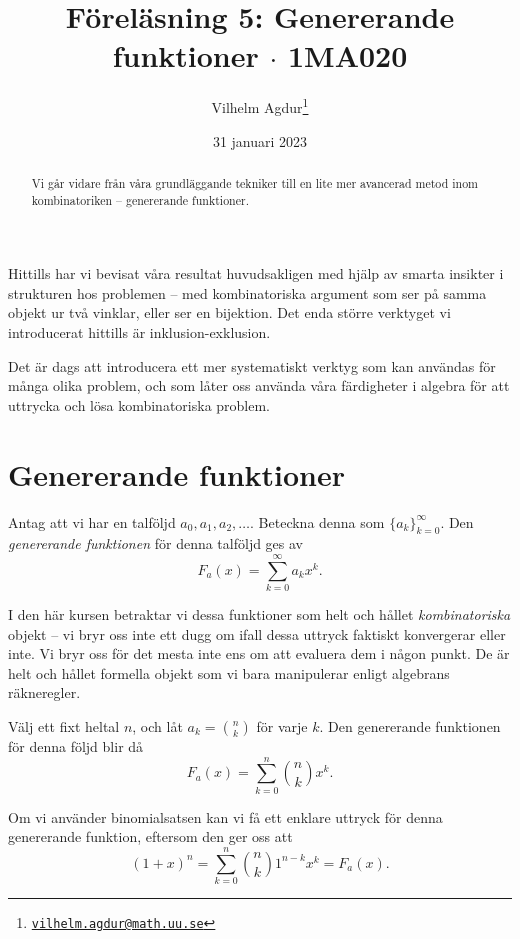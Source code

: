 \documentclass[nobib]{tufte-handout}
\title{Föreläsning 5: Genererande funktioner $\cdot$ 1MA020}
\author[Vilhelm Agdur]{Vilhelm Agdur\thanks{\href{mailto:vilhelm.agdur@math.uu.se}{\nolinkurl{vilhelm.agdur@math.uu.se}}}}
\date{31 januari 2023}
\begin{document}

\maketitle%

\begin{abstract}
\noindent
Vi går vidare från våra grundläggande tekniker till en lite mer avancerad metod inom kombinatoriken -- genererande funktioner.
\end{abstract}

Hittills har vi bevisat våra resultat huvudsakligen med hjälp av smarta insikter i strukturen hos problemen -- med kombinatoriska argument som ser på samma objekt ur två vinklar, eller ser en bijektion. Det enda större verktyget vi introducerat hittills är inklusion-exklusion.

Det är dags att introducera ett mer systematiskt verktyg som kan användas för många olika problem, och som låter oss använda våra färdigheter i algebra för att uttrycka och lösa kombinatoriska problem.

\section{Genererande funktioner}

\begin{definition}
    Antag att vi har en talföljd $a_0, a_1, a_2, \ldots$. Beteckna denna som $\{a_k\}_{k=0}^\infty$. Den \emph{genererande funktionen} för denna talföljd ges av
    $$F_{a}(x) = \sum_{k=0}^{\infty} a_k x^k.$$
\end{definition}

I den här kursen betraktar vi dessa funktioner som helt och hållet \emph{kombinatoriska} objekt -- vi bryr oss inte ett dugg om ifall dessa uttryck faktiskt konvergerar eller inte. Vi bryr oss för det mesta inte ens om att evaluera dem i någon punkt. De är helt och hållet formella objekt som vi bara manipulerar enligt algebrans räkneregler.

\begin{example}
    Välj ett fixt heltal $n$, och låt $a_k = \binom{n}{k}$ för varje $k$. Den genererande funktionen för denna följd blir då
    $$F_a(x) = \sum_{k=0}^{n}\binom{n}{k}x^k.$$

    Om vi använder binomialsatsen kan vi få ett enklare uttryck för denna genererande funktion, eftersom den ger oss att
    $$(1+x)^n = \sum_{k= 0}^{n}\binom{n}{k}1^{n-k}x^k = F_a(x).$$
\end{example}
\end{document}
